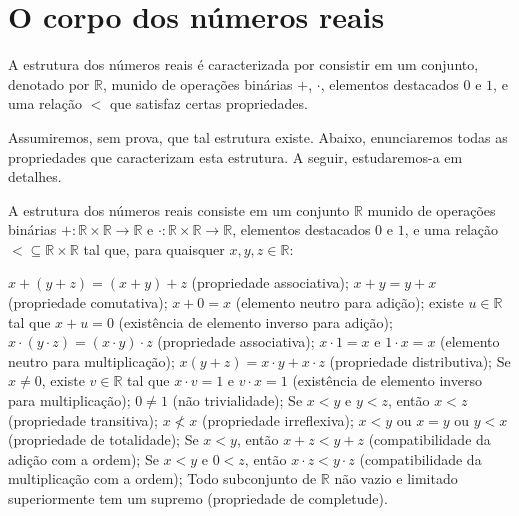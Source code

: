 \section{O corpo dos números reais}
A estrutura dos números reais é caracterizada por consistir em um conjunto, denotado por $\mathbb R$, munido de operações binárias $+$, $\cdot$, elementos destacados $0$ e $1$, e uma relação $<$ que satisfaz certas propriedades.

Assumiremos, sem prova, que tal estrutura existe.
Abaixo, enunciaremos todas as propriedades que caracterizam esta estrutura.
A seguir, estudaremos-a em detalhes.

\begin{definition}
    A estrutura dos números reais consiste em um conjunto $\mathbb R$ munido de operações binárias $+: \mathbb R\times \mathbb R\to \mathbb R$ e $\cdot: \mathbb R\times \mathbb R\to \mathbb R$, elementos destacados $0$ e $1$, e uma relação $<\subseteq \mathbb R\times \mathbb R$ tal que, para quaisquer $x, y, z\in \mathbb R$:
    \begin{enumerate}
         $x+(y+z)=(x+y)+z$ (propriedade associativa);\label{defItem:associativaSoma} \label{defItem:primeiraSoma}
         $x+y=y+x$ (propriedade comutativa); \label{defItem:comutativaSoma}
         $x+0=x$ (elemento neutro para adição); \label{defItem:neutroSoma}
         existe $u\in \mathbb R$ tal que $x+u=0$ (existência de elemento inverso para adição); \label{defItem:inversoSoma} \label{defItem:ultimoSoma}
         $x\cdot (y\cdot z)=(x\cdot y)\cdot z$ (propriedade associativa); \label{defItem:associativaMultiplicacao} \label{defItem:primeiraMultiplicacao}
         $x\cdot 1=x$ e $1\cdot x=x$ (elemento neutro para multiplicação); \label{defItem:neutroMultiplicacao}
         $x(y+z)=x\cdot y+x\cdot z$ (propriedade distributiva); \label{defItem:distributiva}
         Se $x\neq 0$, existe $v\in \mathbb R$ tal que $x\cdot v=1$ e $v\cdot x=1$ (existência de elemento inverso para multiplicação); \label{defItem:inversoMultiplicacao}
         $0\neq 1$ (não trivialidade); \label{defItem:naoTrivialidade} \label{defItem:ultimoMultiplicacao}
         Se $x<y$ e $y<z$, então $x<z$ (propriedade transitiva); \label{defItem:primeiraOrdem} \label{defItem:transitiva}
         $x \not< x$ (propriedade irreflexiva); \label{defItem:segundaOrdem} \label{defItem:irreflexiva}
         $x<y$ ou $x=y$ ou $y<x$ (propriedade de totalidade); \label{defItem:terceiraOrdem} \label{defItem:totalidade}
         Se $x<y$, então $x+z<y+z$ (compatibilidade da adição com a ordem); \label{defItem:compatibilidadeSoma}
         Se $x<y$ e $0<z$, então $x\cdot z<y\cdot z$ (compatibilidade da multiplicação com a ordem); \label{defItem:compatibilidadeMultiplicacao}
         Todo subconjunto de $\mathbb R$ não vazio e limitado superiormente tem um supremo (propriedade de completude). \label{defItem:supremo}
    \end{enumerate}


\end{definition}

